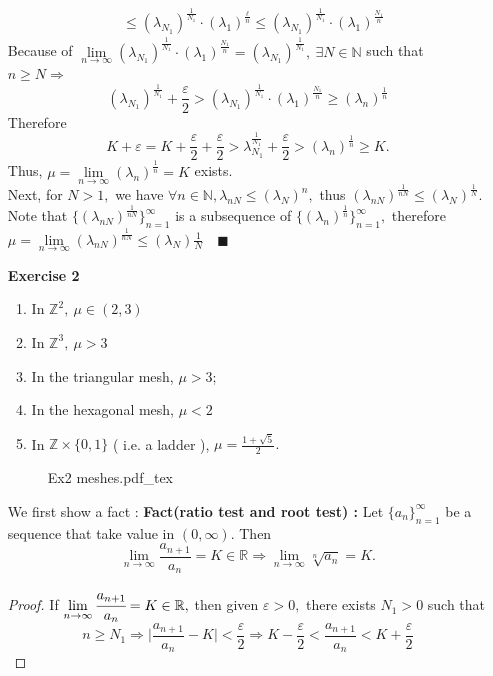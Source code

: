 \documentclass[12pt,a4paper]{report}
\theoremstyle{definition}
\newcommand{\SOL}{\fbox{ \tt s\parbox[b][2pt][c]{6pt}{o}\hspace*{-7pt} L:}}
\newcommand{\incfig}[1]{%
{#1.pdf_tex}
}
\begin{document}
\begin{enumerate}
\begin{align*}
	&\leq (\lambda_{N_1})^\frac{1}{N_1}\cdot (\lambda_1)^\frac{\ell}{n}\leq (\lambda_{N_1})^\frac{1}{N_1}\cdot (\lambda_1)^\frac{N_1}{n}
	\end{align*}
	Because of $\lim\limits_{n\to\infty}(\lambda_{N_1})^{\frac{1}{N_1}}\cdot (\lambda_1)^{\frac{N_1}{n}}=(\lambda_{N_1})^\frac{1}{N_1},\ \exists N\in\mathbb{N}$ such that $n\geq N\Rightarrow$
	\[
	(\lambda_{N_1})^\frac{1}{N_1}+\frac{\varepsilon}{2}>(\lambda_{N_1})^\frac{1}{N_1}\cdot (\lambda_1)^{\frac{N_1}{n}}\geq (\lambda_n)^{\frac{1}{n}}
	\]
	Therefore 
	\[
	K+\varepsilon=K+\frac{\varepsilon}{2}+\frac{\varepsilon}{2}>\lambda_{N_1}^{\frac{1}{N_1}}+\frac{\varepsilon}{2}>(\lambda_n)^{\frac{1}{n}}\geq K.
	\]
	Thus, $\mu=\lim\limits_{n\to\infty}(\lambda_n)^\frac{1}{n}=K$ exists.\\
	Next, for $N>1,$ we have $\forall n\in \mathbb{N}, \lambda_{nN}\leq (\lambda_N)^n,$ thus $(\lambda_{nN})^\frac{1}{nN}\leq (\lambda_N)^\frac{1}{N}.$ Note that $\{(\lambda_{nN})^{\frac{1}{nN}}\}_{n=1}^{\infty}$ is a subsequence of $\{(\lambda_{n})^{\frac{1}{n}}\}_{n=1}^{\infty},$ therefore $\mu=\lim\limits_{n\to\infty}(\lambda_{nN})^\frac{1}{nN}\leq (\lambda_N)\frac{1}{N}\quad \blacksquare$
	\item[\textbf{Exercise 2}] \begin{enumerate}
		\item In $\mathbb{Z}^2,\ \mu\in (2,3)$
		\item In $\mathbb{Z}^3,\ \mu>3$
		\item In the triangular mesh, $\mu>3$;
		\item In the hexagonal mesh, $\mu<2$
		\item In $\mathbb{Z}\times \{0,1\}$ ( i.e. a ladder ), $\mu=\frac{1+\sqrt{5}}{2}.$
	\end{enumerate}
	\begin{figure}[htp]
	\centering
	\def\svgwidth{15cm}
	\incfig{Ex2 meshes}
	\end{figure}
	\item[\SOL] We first show a fact : 
	\newpage
	\textbf{Fact(ratio test and root test) :} Let $\{a_n\}_{n=1}^\infty$ be a sequence that take value in $(0,\infty).$ Then
	\[
	\lim_{n\to\infty}\frac{a_{n+1}}{a_n}=K\in\mathbb{R}\Rightarrow \lim_{n\to\infty}\sqrt[n]{a_n}=K.
	\]
	\begin{proof}
	If $\lim\limits_{n\to\infty}\cfrac{a_{n+1}}{a_n}=K\in\mathbb{R},$ then given $\varepsilon>0,$ there exists $N_1>0$ such that 
	\[
    	n\geq N_1\Rightarrow \Big|\frac{a_{n+1}}{a_n}-K\Big|<\frac{\varepsilon}{2}\Rightarrow K-\frac{\varepsilon}{2}<\frac{a_{n+1}}{a_n}<K+\frac{\varepsilon}{2}
\]
\end{proof}
\end{enumerate}
\end{document}
